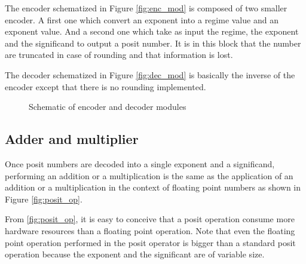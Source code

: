 The encoder schematized in Figure \ref{fig:enc_mod} is composed of two smaller encoder. A first one which convert an exponent into a regime value and an exponent value. And a second one which take as input the regime, the exponent and the significand to output a posit number. It is in this block that the number are truncated in case of rounding and that information is lost.

The decoder schematized in Figure \ref{fig:dec_mod} is basically the inverse of the encoder except that there is no rounding implemented.

\begin{figure}[!ht]
\begin{mdframed}
	\caption{Schematic of encoder and decoder modules}
	\label{fig:enc_dec_mod}
\end{mdframed}
\end{figure}

\subsection{Adder and multiplier}
Once posit numbers are decoded into a single exponent and a significand, performing an addition or a multiplication is the same as the application of an addition or a multiplication in the context of floating point numbers as shown in Figure \ref{fig:posit_op}.

From \ref{fig:posit_op}, it is easy to conceive that a posit operation consume more hardware resources than a floating point operation. Note that even the floating point operation performed in the posit operator is bigger than a standard posit operation because the exponent and the significant are of variable size.


